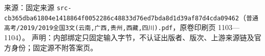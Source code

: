 
\begin{gktip}
来源：固定来源 \texttt{src-cb365dba61804e1418864f0052286c48833d76ed7bda8d1d39af87d4cda09462}（\texttt{普通高考/2019/2019全国3文(云南,广西,贵州,西藏,四川).pdf}，原卷印刷页 1103—1104）。
声明：内部绑定只固定输入字节，不认证出版者、版次、上游来源链及官方身份；固定源不附答案页。
\end{gktip}

\par\medskip


